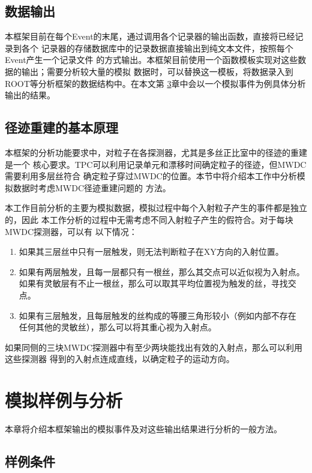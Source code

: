 \documentclass[bachelor,openany,oneside,color]{buaathesis}
\begin{document}
\section{数据输出}

本框架目前在每个Event的末尾，通过调用各个记录器的输出函数，直接将已经记录到各个
记录器的存储数据库中的记录数据直接输出到纯文本文件，按照每个Event产生一个记录文件
的方式输出。本框架目前使用一个函数模板实现对这些数据的输出；需要分析较大量的模拟
数据时，可以替换这一模板，将数据录入到ROOT等分析框架的数据结构中。在本文第
\ref{chap:例子}章中会以一个模拟事件为例具体分析输出的结果。

\section{径迹重建的基本原理}

本框架的分析功能要求中，对粒子在各探测器，尤其是多丝正比室中的径迹的重建是一个
核心要求。TPC可以利用记录单元和漂移时间确定粒子的径迹，但MWDC需要利用多层丝符合
确定粒子穿过MWDC的位置。本节中将介绍本工作中分析模拟数据时考虑MWDC径迹重建问题的
方法。

本工作目前分析的主要为模拟数据，模拟过程中每个入射粒子产生的事件都是独立的，因此
本工作分析的过程中无需考虑不同入射粒子产生的假符合。对于每块MWDC探测器，可以有
以下情况：
\begin{enumerate}
	\item 如果其三层丝中只有一层触发，则无法判断粒子在XY方向的入射位置。
	\item 如果有两层触发，且每一层都只有一根丝，那么其交点可以近似视为入射点。
		如果有灵敏层有不止一根丝，那么可以取其平均位置视为触发的丝，寻找交点。
	\item 如果有三层触发，且每层触发的丝构成的等腰三角形较小（例如内部不存在
		任何其他的灵敏丝），那么可以将其重心视为入射点。
\end{enumerate}

如果同侧的三块MWDC探测器中有至少两块能找出有效的入射点，那么可以利用这些探测器
得到的入射点连成直线，以确定粒子的运动方向。


\chapter{模拟样例与分析}\label{chap:例子}

本章将介绍本框架输出的模拟事件及对这些输出结果进行分析的一般方法。

\section{样例条件}
\end{document}
